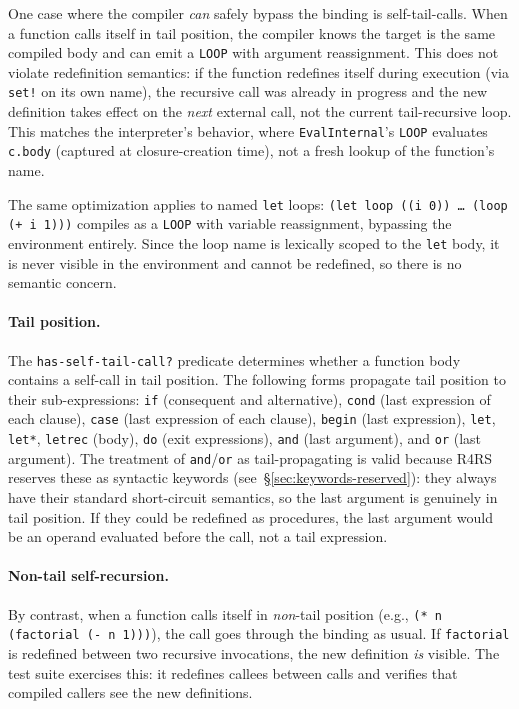 \documentclass[12pt]{report}
\begin{document}
One case where the compiler \emph{can} safely bypass the binding
is self-tail-calls.  When a function calls itself in tail position,
the compiler knows the target is the same compiled body and can
emit a \texttt{LOOP} with argument reassignment.  This does not
violate redefinition semantics: if the function redefines itself
during execution (via \texttt{set!} on its own name), the
recursive call was already in progress and the new definition
takes effect on the \emph{next} external call, not the current
tail-recursive loop.  This matches the interpreter's behavior,
where \texttt{EvalInternal}'s \texttt{LOOP} evaluates
\texttt{c.body} (captured at closure-creation time), not a fresh
lookup of the function's name.

The same optimization applies to named \texttt{let} loops:
\texttt{(let loop ((i 0)) \ldots\ (loop (+ i 1)))} compiles as
a \texttt{LOOP} with variable reassignment, bypassing the
environment entirely.  Since the loop name is lexically scoped to
the \texttt{let} body, it is never visible in the environment and
cannot be redefined, so there is no semantic concern.

\paragraph{Tail position.}
The \texttt{has-self-tail-call?} predicate determines whether a
function body contains a self-call in tail position.  The following
forms propagate tail position to their sub-expressions:
\texttt{if} (consequent and alternative),
\texttt{cond} (last expression of each clause),
\texttt{case} (last expression of each clause),
\texttt{begin} (last expression),
\texttt{let}, \texttt{let*}, \texttt{letrec} (body),
\texttt{do} (exit expressions),
\texttt{and} (last argument),
and \texttt{or} (last argument).
The treatment of \texttt{and}/\texttt{or} as tail-propagating is
valid because R4RS reserves these as syntactic keywords
(see~\S\ref{sec:keywords-reserved}): they always have their
standard short-circuit semantics, so the last argument is genuinely
in tail position.  If they could be redefined as procedures, the
last argument would be an operand evaluated before the call, not
a tail expression.

\paragraph{Non-tail self-recursion.}
By contrast, when a function calls itself in \emph{non}-tail
position (e.g., \texttt{(* n (factorial (- n 1)))}), the call
goes through the binding as usual.  If \texttt{factorial} is
redefined between two recursive invocations, the new definition
\emph{is} visible.  The test suite exercises this: it redefines
callees between calls and verifies that compiled callers see the
new definitions.
\end{document}
